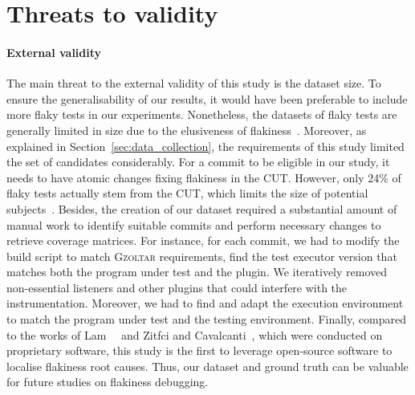 \section{Threats to validity}
\label{sec:sherloc-threats}


\paragraph{External validity}
The main threat to the external validity of this study is the dataset size.
To ensure the generalisability of our results, it would have been preferable to include more flaky tests in our experiments. 
Nonetheless, the datasets of flaky tests are generally limited in size due to the elusiveness of flakiness~\cite{habchi2021mutinject,Haben2021,alshammari2021flakeflagger}.
Moreover, as explained in Section~\ref{sec:data_collection}, the requirements of this study limited the set of candidates considerably.
For a commit to be eligible in our study, it needs to have atomic changes fixing flakiness in the CUT.
However, only 24\% of flaky tests actually stem from the CUT, which limits the size of potential subjects~\cite{Luo2014}.
Besides, the creation of our dataset required a substantial amount of manual work to identify suitable commits and perform necessary changes to retrieve coverage matrices.
For instance, for each commit, we had to modify the build script to match \textsc{Gzoltar} requirements, \ie find the test executor version that matches both the program under test and the plugin.
We iteratively removed non-essential listeners and other plugins that could interfere with the instrumentation.
Moreover, we had to find and adapt the execution environment to match the program under test and the testing environment.
Finally, compared to the works of Lam~\etal~\cite{Lam2019RootCausing} and Zitfci and Cavalcanti~\cite{De-Flake}, which were conducted on proprietary software, this study is the first to leverage open-source software to localise flakiness root causes.
Thus, our dataset and ground truth can be valuable for future studies on flakiness debugging.



